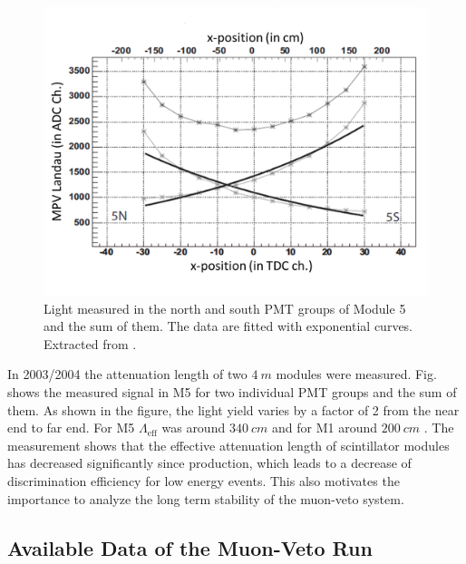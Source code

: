 \begin{figure}[ht!]
  \centering
  \includegraphics[width=0.6\textwidth{}]{./fig/pos-dependent.png}
  \caption{Light measured in the north and south PMT groups of Module 5 and the sum of them. The data are fitted with exponential curves. Extracted from \cite{Hab04}.}
  \label{fig:pos-dependent}
\end{figure}

In 2003/2004 the attenuation length of two $\SI{4}{m}$ modules were measured. Fig. shows the measured signal in M5 for two individual PMT groups and the sum of them. As shown in the figure, the light yield varies by a factor of 2 from the near end to far end.
For M5 $\Lambda_{\mathrm{eff}}$ was around $\SI{340}{cm}$ and for M1 around $\SI{200}{cm}$ \cite{Hab04}. The measurement shows that the effective attenuation length of scintillator modules has decreased significantly since production, which leads to a decrease of discrimination efficiency for low energy events. This also motivates the importance to analyze the long term stability of the muon-veto system.


\subsection{Available Data of the Muon-Veto Run}

